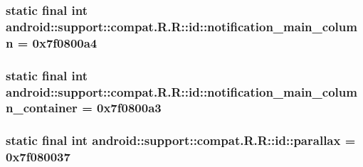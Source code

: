 \hypertarget{classandroid_1_1support_1_1compat_1_1_r_1_1id_74e86e509cef1cbff8584c0f5a83e468}{
\subsubsection[{notification\_\-main\_\-column}]{\setlength{\rightskip}{0pt plus 5cm}static final int android::support::compat.R.R::id::notification\_\-main\_\-column = 0x7f0800a4}}
\label{classandroid_1_1support_1_1compat_1_1_r_1_1id_74e86e509cef1cbff8584c0f5a83e468}


\hypertarget{classandroid_1_1support_1_1compat_1_1_r_1_1id_b4693e522690ee1016bd4e2420289564}{
\subsubsection[{notification\_\-main\_\-column\_\-container}]{\setlength{\rightskip}{0pt plus 5cm}static final int android::support::compat.R.R::id::notification\_\-main\_\-column\_\-container = 0x7f0800a3}}
\label{classandroid_1_1support_1_1compat_1_1_r_1_1id_b4693e522690ee1016bd4e2420289564}


\hypertarget{classandroid_1_1support_1_1compat_1_1_r_1_1id_522c13663fe0becb5c222f8cb9c62040}{
\subsubsection[{parallax}]{\setlength{\rightskip}{0pt plus 5cm}static final int android::support::compat.R.R::id::parallax = 0x7f080037}}
\label{classandroid_1_1support_1_1compat_1_1_r_1_1id_522c13663fe0becb5c222f8cb9c62040}


